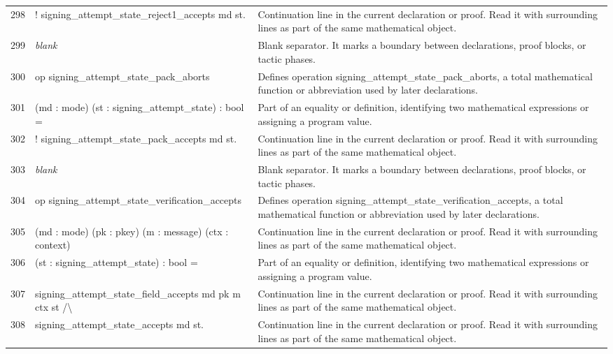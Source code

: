 \documentclass[10pt]{article}
\begin{document}
\begin{longtable}{r L{0.53\textwidth} L{0.37\textwidth}}
298 & {\ttfamily\scriptsize   ! signing\_attempt\_state\_reject1\_accepts md st.} & Continuation line in the current declaration or proof.  Read it with surrounding lines as part of the same mathematical object. \\
299 & {\ttfamily\scriptsize \emph{blank}} & Blank separator.  It marks a boundary between declarations, proof blocks, or tactic phases. \\
300 & {\ttfamily\scriptsize op signing\_attempt\_state\_pack\_aborts} & Defines operation signing\_attempt\_state\_pack\_aborts, a total mathematical function or abbreviation used by later declarations. \\
301 & {\ttfamily\scriptsize    (md : mode) (st : signing\_attempt\_state) : bool =} & Part of an equality or definition, identifying two mathematical expressions or assigning a program value. \\
302 & {\ttfamily\scriptsize   ! signing\_attempt\_state\_pack\_accepts md st.} & Continuation line in the current declaration or proof.  Read it with surrounding lines as part of the same mathematical object. \\
303 & {\ttfamily\scriptsize \emph{blank}} & Blank separator.  It marks a boundary between declarations, proof blocks, or tactic phases. \\
304 & {\ttfamily\scriptsize op signing\_attempt\_state\_verification\_accepts} & Defines operation signing\_attempt\_state\_verification\_accepts, a total mathematical function or abbreviation used by later declarations. \\
305 & {\ttfamily\scriptsize    (md : mode) (pk : pkey) (m : message) (ctx : context)} & Continuation line in the current declaration or proof.  Read it with surrounding lines as part of the same mathematical object. \\
306 & {\ttfamily\scriptsize    (st : signing\_attempt\_state) : bool =} & Part of an equality or definition, identifying two mathematical expressions or assigning a program value. \\
307 & {\ttfamily\scriptsize   signing\_attempt\_state\_field\_accepts md pk m ctx st /\textbackslash{}} & Continuation line in the current declaration or proof.  Read it with surrounding lines as part of the same mathematical object. \\
308 & {\ttfamily\scriptsize   signing\_attempt\_state\_accepts md st.} & Continuation line in the current declaration or proof.  Read it with surrounding lines as part of the same mathematical object. \\

\end{longtable}
\end{document}
